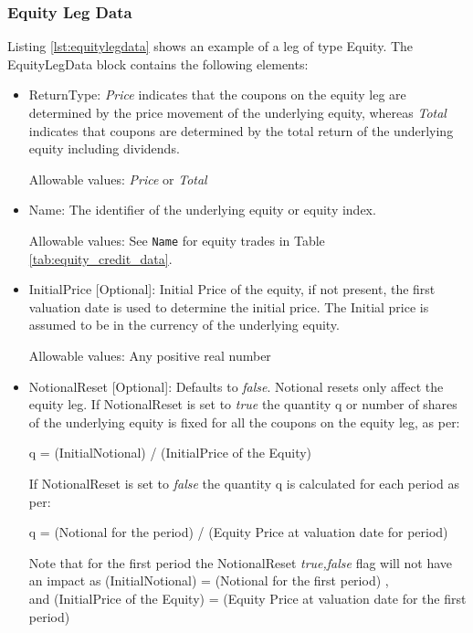 \subsubsection{Equity Leg Data}
\label{ss:equitylegdata}

Listing \ref{lst:equitylegdata} shows an example of a leg of type Equity. The EquityLegData block contains the following
elements:

\begin{itemize}
\item ReturnType: \emph{Price} indicates that the coupons on the equity leg are determined by the price movement of the underlying equity, whereas  \emph{Total} indicates that coupons are determined by the total return of the underlying equity including dividends.

Allowable values:  \emph{Price} or  \emph{Total}

\item Name: The identifier of the underlying equity or equity index.
 
 Allowable values: See \lstinline!Name! for equity trades in Table \ref{tab:equity_credit_data}. \\

\item InitialPrice [Optional]: Initial Price of the equity, if not present, the first valuation date is used to determine the initial price. The Initial price is assumed to be in the currency of the underlying equity.

Allowable values: Any positive real number

\item NotionalReset [Optional]: Defaults to \emph{false}.  Notional resets only affect the equity leg.
If NotionalReset is set to \emph{true} the quantity q or number of shares of the underlying equity  is fixed for all the coupons on the equity leg, as per:

q = (InitialNotional) / (InitialPrice of the Equity)

If NotionalReset is set to \emph{false} the quantity q  is calculated for each period as per:

q = (Notional for the period) / (Equity Price at valuation date for period)

Note that for the first period the NotionalReset \emph{true,false} flag will not have an impact as 
(InitialNotional) = (Notional for the first period) , \\
and (InitialPrice of the Equity) = (Equity Price at valuation date for the first period)


\end{itemize}
